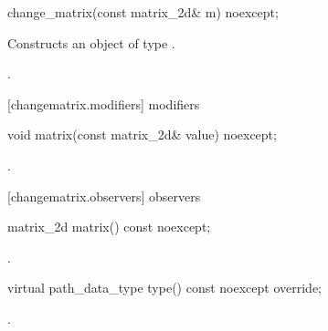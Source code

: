 \begin{itemdecl}
    change_matrix(const matrix_2d& m) noexcept;
\end{itemdecl}
\begin{itemdescr}
	\pnum
	\effects
	Constructs an object of type .
	
	\pnum
	\postconditions
	.
\end{itemdescr}

 [changematrix.modifiers]{ modifiers}

\begin{itemdecl}
    void matrix(const matrix_2d& value) noexcept;
\end{itemdecl}
\begin{itemdescr}
	\pnum
	\postconditions
	.
	
\end{itemdescr}

 [changematrix.observers]{ observers}

\begin{itemdecl}
    matrix_2d matrix() const noexcept;
\end{itemdecl}
\begin{itemdescr}
	\pnum
	\returns
	.

\end{itemdescr}

\begin{itemdecl}
    virtual path_data_type type() const noexcept override;
\end{itemdecl}
\begin{itemdescr}
	\pnum
	\returns
	.

\end{itemdescr}
